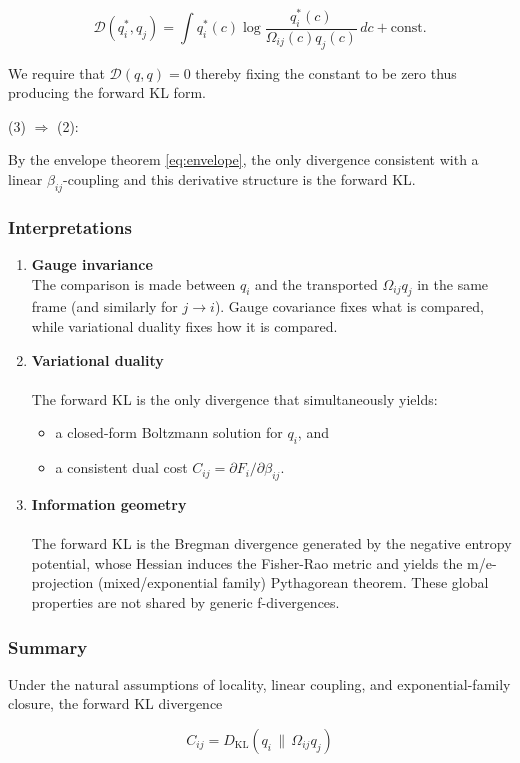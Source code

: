 \documentclass[11pt]{article}
\begin{document}
\[
\mathcal{D}(q_i^*,q_j)
= \int q_i^*(c)
\log\frac{q_i^*(c)}{\Omega_{ij}(c) q_j(c)}\,dc
+ \text{const}.
\]

We require that $\mathcal{D}(q,q)=0$ thereby fixing the constant to be zero thus producing the forward KL form.

(3) $\Rightarrow$ (2):

By the envelope theorem \eqref{eq:envelope}, the only divergence consistent with a linear $\beta_{ij}$-coupling and this derivative structure is the forward KL.

\subsubsection{Interpretations}
\begin{enumerate}
  \item \textbf{Gauge invariance}\\
The comparison is made between $q_i$ and the transported $\Omega_{ij}q_j$ in the same frame (and similarly for $j \rightarrow i$). Gauge covariance fixes what is compared, while variational duality fixes how it is compared.
  \item \textbf{Variational duality}\\
\\
The forward KL is the only divergence that simultaneously yields:
  \begin{itemize}
    \item a closed-form Boltzmann solution for $q_i$, and
    \item a consistent dual cost $C_{ij} = \partial F_i / 
\partial \beta_{ij}$.
  \end{itemize}
  \item \textbf{Information geometry}\\
\\
The forward KL is the Bregman divergence generated by the negative entropy potential, whose Hessian induces the Fisher-Rao metric and yields the m/e-projection (mixed/exponential family) Pythagorean theorem. These global properties are not shared by generic f-divergences.
\end{enumerate}

\subsubsection{Summary}
Under the natural assumptions of locality, linear coupling, and exponential-family closure, the forward KL divergence

\[
\boxed{
C_{ij}=D_{\mathrm{KL}}(q_i \,\|\, \Omega_{ij} q_j)}
\]
\end{document}
